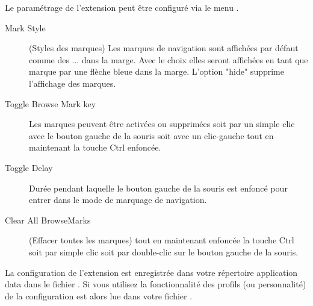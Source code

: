 Le paramétrage de l'extension peut être configuré via le menu .


\begin{description}
\item[Mark Style] (Styles des marques) Les marques de navigation sont affichées par défaut comme des $\ldots$ dans la marge. Avec le choix  elles seront affichées en tant que marque par une flèche bleue dans la marge. L'option "hide" supprime l'affichage des marques.
\item[Toggle Browse Mark key] Les marques peuvent être activées ou supprimées soit par un simple clic avec le bouton gauche de la souris soit avec un clic-gauche tout en maintenant la touche Ctrl enfoncée.
\item[Toggle Delay] Durée pendant laquelle le bouton gauche de la souris est enfoncé pour entrer dans le mode de marquage de navigation.
\item[Clear All BrowseMarks] (Effacer toutes les marques) tout en maintenant enfoncée la touche Ctrl soit par simple clic soit par double-clic sur le bouton gauche de la souris.
\end{description}

La configuration de l'extension est enregistrée dans votre répertoire application data dans le fichier . Si vous utilisez la fonctionnalité des profils (ou personnalité) de \codeblocks la configuration est alors lue dans votre fichier .






